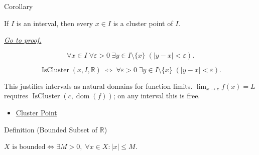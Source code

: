 
\begin{corollarybox}{Corollary}
\begin{corollary}
\label{cor:interval-all-limit-points}
If $I$ is an interval, then every $x\in I$ is a cluster point of $I$.

\smallskip\noindent
\hyperref[prf:interval-all-limit-points]{\textit{Go to proof.}}
\end{corollary}
\end{corollarybox}

\begin{remark*}
\[
  \forall x\in I\;\forall\varepsilon>0\;\exists y\in I\setminus\{x\}\;(|y-x|<\varepsilon).
\]
\end{remark*}

\begin{remark*}
\[
  \operatorname{IsCluster}(x,I,\mathbb{R})
  \;\Longleftrightarrow\;
  \forall\varepsilon>0\;\exists y\in I\setminus\{x\}\;(|y-x|<\varepsilon).
\]
\end{remark*}

\begin{remark*}[Interpretation]
This justifies intervals as natural domains for function limits.
$\lim_{x\to c}f(x)=L$ requires
$\operatorname{IsCluster}(c, \operatorname{dom}(f))$; on any
interval this is free.
\end{remark*}

\begin{dependencies}
\begin{itemize}
  \item \hyperref[def:cluster-point-r]{Cluster Point}
\end{itemize}
\end{dependencies}


\begin{definitionbox}{Definition (Bounded Subset of $\mathbb{R}$)}
\begin{definition}
\label{def:bounded-set-r}
$X\text{ is bounded} \iff \exists M>0,\;\forall x\in X:
|x|\leq M$.
\end{definition}
\end{definitionbox}

